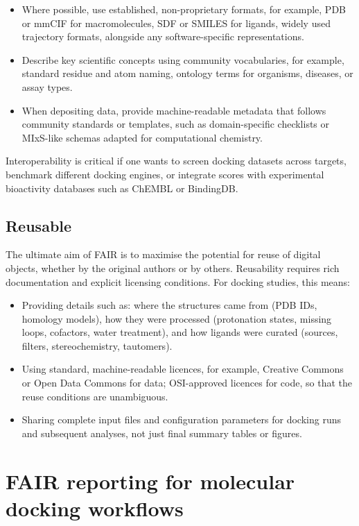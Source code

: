 \documentclass[12pt]{article}
\begin{document}
\begin{itemize}
  \item Where possible, use established, non-proprietary formats, for example, PDB or mmCIF for macromolecules, SDF or SMILES for ligands, widely used trajectory formats, alongside any software-specific representations.
  \item Describe key scientific concepts using community vocabularies, for example, standard residue and atom naming, ontology terms for organisms, diseases, or assay types.
  \item When depositing data, provide machine-readable metadata that follows community standards or templates, such as domain-specific checklists or MIxS-like schemas adapted for computational chemistry.
\end{itemize}

Interoperability is critical if one wants to screen docking datasets across targets, benchmark different docking engines, or integrate scores with experimental bioactivity databases such as ChEMBL or BindingDB.

\subsection{Reusable}

The ultimate aim of FAIR is to maximise the potential for reuse of digital objects, whether by the original authors or by others\cite{CH12_wilkinson2016FAIR,CH12_goFairPrinciples,CH12_nnlmFAIR}. Reusability requires rich documentation and explicit licensing conditions. For docking studies, this means:

\begin{itemize}
  \item Providing details such as: where the structures came from (PDB IDs, homology models), how they were processed (protonation states, missing loops, cofactors, water treatment), and how ligands were curated (sources, filters, stereochemistry, tautomers).
  \item Using standard, machine-readable licences, for example, Creative Commons or Open Data Commons for data; OSI-approved licences for code, so that the reuse conditions are unambiguous.
  \item Sharing complete input files and configuration parameters for docking runs and subsequent analyses, not just final summary tables or figures.
\end{itemize}


\section{FAIR reporting for molecular docking workflows}
\end{document}
